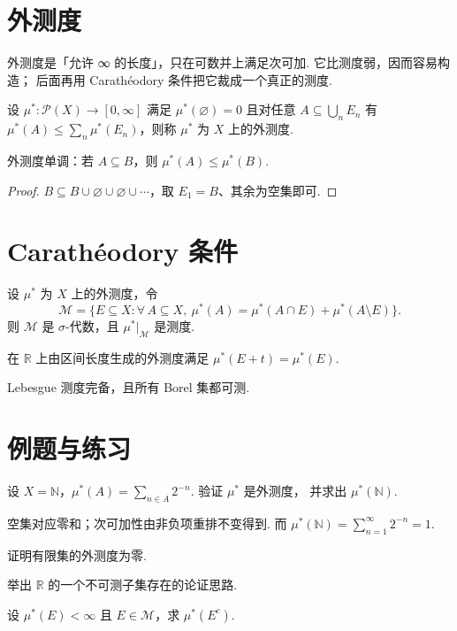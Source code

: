 \section{外测度}

\begin{wenxintishi}[阅读顺序]
外测度是「允许 ∞ 的长度」，只在可数并上满足次可加. 它比测度弱，因而容易构造；
后面再用 Carathéodory 条件把它裁成一个真正的测度.
\end{wenxintishi}

\begin{definition}[外测度]
设 $\mu^{*}:\mathcal{P}(X)\to[0,\infty]$ 满足 $\mu^{*}(\varnothing)=0$ 且对任意
$A\subseteq\bigcup_{n}E_n$ 有 $\mu^{*}(A)\le\sum_n\mu^{*}(E_n)$，则称 $\mu^{*}$
为 $X$ 上的外测度.
\end{definition}

\begin{lemma}[单调性]
外测度单调：若 $A\subseteq B$，则 $\mu^{*}(A)\le\mu^{*}(B)$.
\end{lemma}
\begin{proof}
$B\subseteq B\cup\varnothing\cup\varnothing\cup\cdots$，取 $E_1=B$、其余为空集即可.
\end{proof}

\section{Carathéodory 条件}

\begin{theorem}[Carathéodory 判别]
设 $\mu^{*}$ 为 $X$ 上的外测度，令
\[
\mathcal{M}=\{E\subseteq X:\forall\,A\subseteq X,\ \mu^{*}(A)=\mu^{*}(A\cap E)+\mu^{*}(A\setminus E)\}.
\]
则 $\mathcal{M}$ 是 $\sigma$-代数，且 $\mu^{*}\!|_{\mathcal{M}}$ 是测度.
\end{theorem}

\begin{proposition}[平移不变的外测度]
在 $\mathbb{R}$ 上由区间长度生成的外测度满足 $\mu^{*}(E+t)=\mu^{*}(E)$.
\end{proposition}

\begin{corollary}
Lebesgue 测度完备，且所有 Borel 集都可测.
\end{corollary}

\section{例题与练习}

\begin{example}[构造外测度]
设 $X=\mathbb{N}$，$\mu^{*}(A)=\sum_{n\in A}2^{-n}$. 验证 $\mu^{*}$ 是外测度，
并求出 $\mu^{*}(\mathbb{N})$.
\end{example}
\begin{solution}
空集对应零和；次可加性由非负项重排不变得到. 而
$\mu^{*}(\mathbb{N})=\sum_{n=1}^{\infty}2^{-n}=1$.
\end{solution}

\begin{Exercises}
  \item 证明有限集的外测度为零.
  \item 举出 $\mathbb{R}$ 的一个不可测子集存在的论证思路.
  \item 设 $\mu^{*}(E)<\infty$ 且 $E\in\mathcal{M}$，求 $\mu^{*}(E^{c})$.
\end{Exercises}
